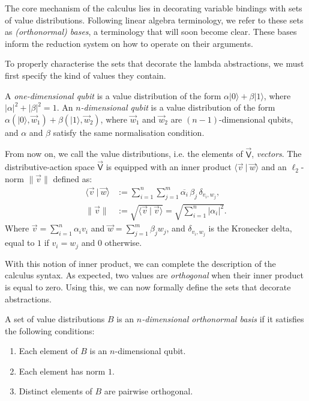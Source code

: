 \documentclass[runningheads,orivec,envcountsame,envcountsect]{llncs}
\newcommand\ket[1]{\ensuremath{|#1\rangle}}
\newcommand\s[1]{\ensuremath{\mathsf{#1}}}
\newcommand\ValD{\vec{\s V}}
\def\scal#1#2{\langle{#1}~|~{#2}\rangle}
\def\Pair#1#2{(#1,#2)} %
\begin{document}
The core mechanism of the calculus lies in decorating variable bindings with
sets of value distributions. Following linear algebra terminology, we refer to
these sets as \emph{(orthonormal) bases}, a terminology that will soon become
clear. These bases inform the reduction system on how to operate on their
arguments.

To properly characterise the sets that decorate the lambda abstractions, we
must first specify the kind of values they contain.
\begin{definition}[Qubits]
  A \emph{one-dimensional qubit} is a value distribution of the form
  $\alpha\ket{0} + \beta\ket{1}$, where $|\alpha|^2 + |\beta|^2 = 1$. An
  \emph{$n$-dimensional qubit} is a value distribution of the form
  $\alpha\Pair{\ket{0}}{\vec w_1} + \beta\Pair{\ket{1}}{\vec w_2}$, where
  $\vec w_1$ and $\vec w_2$ are $(n-1)$-dimensional qubits, and $\alpha$ and
  $\beta$ satisfy the same normalisation condition.
\end{definition}

From now on, we call the value distributions, i.e. the elements of $\ValD$,
\emph{vectors}. The distributive-action space $\ValD$ is equipped with an inner
product $\scal{\vec v}{\vec w}$ and an $\ell_2$-norm $\|\vec v\|$ defined as:
\begin{align*}
  \scal{\vec{v}}{\vec{w}} &:= \sum_{i=1}^n\sum_{j=1}^m
  \overline{\alpha_i}\,\beta_j\,\delta_{v_i,w_j},\\
  \|\vec{v}\| &:= \sqrt{\scal{\vec{v}}{\vec{v}}}
  = \sqrt{\sum_{i=1}^n|\alpha_i|^2}.
\end{align*}
Where $\vec{v}=\sum_{i=1}^n\alpha_i v_i$ and
$\vec{w}=\sum_{j=1}^m\beta_j w_j$, and $\delta_{v_i,w_j}$ is the Kronecker
delta, equal to $1$ if $v_i=w_j$ and $0$ otherwise.

With this notion of inner product, we can complete the description of the
calculus syntax. As expected, two values are \emph{orthogonal} when their inner
product is equal to zero. Using this, we can now formally define the sets that
decorate abstractions.
\begin{definition}[Basis]\label{def:NthDimensionalBasis}
  A set of value distributions $B$ is an \emph{$n$-dimensional orthonormal
  basis} if it satisfies the following conditions:
  \begin{enumerate}
    \item Each element of $B$ is an $n$-dimensional qubit.
    \item Each element has norm $1$.
    \item Distinct elements of $B$ are pairwise orthogonal.
  \end{enumerate}
\end{definition}
\end{document}

